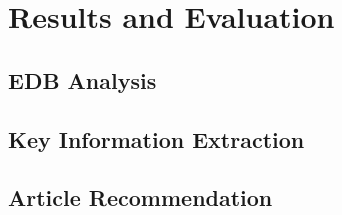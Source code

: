 \chapter{Results and Evaluation}
\section{EDB Analysis}\label{edb analysis}
\section{Key Information Extraction}
\section{Article Recommendation}

